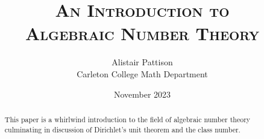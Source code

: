\documentclass{article}
\title{\scshape {\normalsize An Introduction to} \\ {\scshape Algebraic Number Theory}}
\author{Alistair Pattison \\ {\small Carleton College Math Department}}
\date{November 2023}
\begin{document}
\maketitle

\begin{abstract}
    This paper is a whirlwind introduction to the field of algebraic number theory culminating in discussion of Dirichlet's unit theorem and the class number.
\end{abstract}

\bigskip

\tableofcontents

\thispagestyle{empty}

\newpage

\pagestyle{fancy}
\setcounter{page}{1}









\clearpage

\printbibliography
\end{document}

